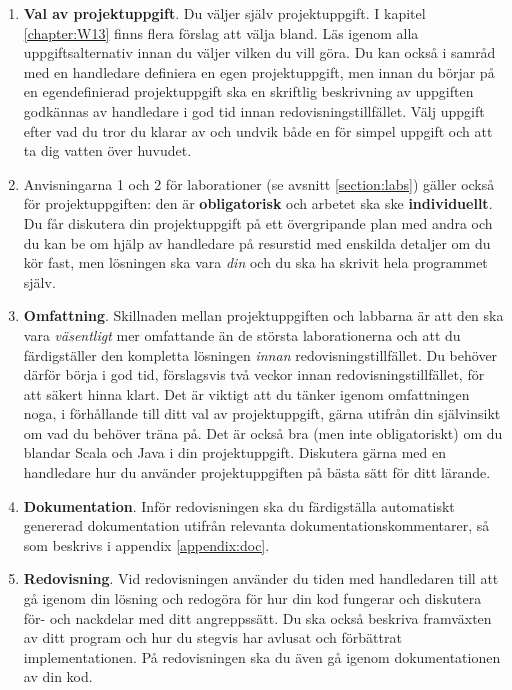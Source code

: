 \begin{enumerate}
\item \textbf{Val av projektuppgift}.
Du väljer själv projektuppgift. I kapitel \ref{chapter:W13} finns flera förslag att välja bland. Läs igenom alla uppgiftsalternativ innan du väljer vilken du vill göra. Du kan också i samråd med en handledare definiera en egen projektuppgift, men innan du börjar på en egendefinierad projektuppgift ska en skriftlig beskrivning av uppgiften godkännas av handledare i god tid innan redovisningstillfället. Välj uppgift efter vad du tror du klarar av och undvik både en för simpel uppgift och att ta dig vatten över huvudet.

\item
Anvisningarna 1 och 2 för laborationer (se avsnitt \ref{section:labs}) gäller också för projektuppgiften: den är \textbf{obligatorisk} och arbetet ska ske \textbf{individuellt}.
Du får diskutera din projektuppgift på ett övergripande plan med andra och du kan be om hjälp av handledare på resurstid med enskilda detaljer om du kör fast, men lösningen ska vara \emph{din} och du ska ha skrivit hela programmet själv.


\item \textbf{Omfattning}.
Skillnaden mellan projektuppgiften och labbarna är att den ska vara \emph{väsentligt} mer omfattande än de största laborationerna och att du färdigställer den kompletta lösningen  \emph{innan} redovisningstillfället. Du behöver därför börja i god tid, förslagsvis två veckor innan redovisningstillfället, för att säkert hinna klart. Det är viktigt att du tänker igenom omfattningen noga, i förhållande till ditt val av projektuppgift, gärna utifrån din självinsikt om vad du behöver träna på. Det är också bra (men inte obligatoriskt) om du blandar Scala och Java i din projektuppgift. Diskutera gärna med en handledare hur du använder projektuppgiften på bästa sätt för ditt lärande.

\item \textbf{Dokumentation}. Inför redovisningen ska du färdigställa automatiskt genererad dokumentation utifrån relevanta dokumentationskommentarer, så som beskrivs i appendix \ref{appendix:doc}.

\item \textbf{Redovisning}.
Vid redovisningen använder du tiden med handledaren till att gå igenom din lösning och redogöra för hur din kod fungerar och diskutera för- och nackdelar med ditt angreppssätt. Du ska också beskriva framväxten av ditt program och hur du stegvis har avlusat och förbättrat implementationen. På redovisningen ska du även gå igenom dokumentationen av din kod.

\end{enumerate}

